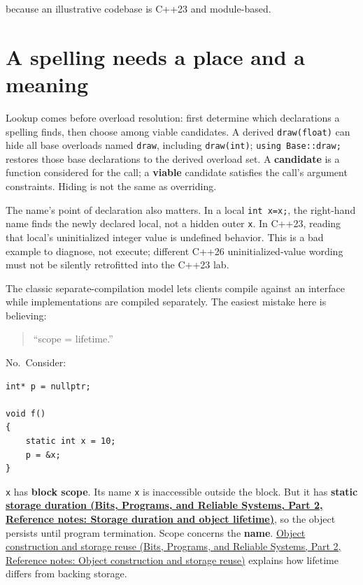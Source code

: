because an illustrative codebase is C++23 and module-based.

\section{A spelling needs a place and a meaning}\label{05-engine-i-ch002-a-spelling-needs-a-place-and-a-meaning}

\hypertarget{05-engine-i-ch002-a-spelling-needs-a-place-and-a-meaning}{}

Lookup comes before overload resolution: first determine which declarations a spelling finds, then choose among viable candidates. A derived \texttt{draw(float)} can hide all base overloads named \texttt{draw}, including \texttt{draw(int)}; \texttt{using\ Base::draw;} restores those base declarations to the derived overload set. A \textbf{candidate} is a function considered for the call; a \textbf{viable} candidate satisfies the call's argument constraints. Hiding is not the same as overriding.

The name's point of declaration also matters. In a local \texttt{int\ x=x;}, the right-hand name finds the newly declared local, not a hidden outer \texttt{x}. In C++23, reading that local's uninitialized integer value is undefined behavior. This is a bad example to diagnose, not execute; different C++26 uninitialized-value wording must not be silently retrofitted into the C++23 lab.

The classic separate-compilation model lets clients compile against an interface while implementations are compiled separately. The easiest mistake here is believing:

\begin{quote}
``scope = lifetime.''
\end{quote}

No.~Consider:

\begin{verbatim}
int* p = nullptr;

void f()
{
    static int x = 10;
    p = &x;
}
\end{verbatim}

\texttt{x} has \textbf{block scope}. Its name \texttt{x} is inaccessible outside the block. But it has \textbf{static \href{../01-Bits-Programs-and-Reliable-Systems-P02/main.pdf\#nameddest=appendix-0b104bcba06b}{storage duration (Bits, Programs, and Reliable Systems, Part 2, Reference notes: Storage duration and object lifetime)}}, so the object persists until program termination. Scope concerns the \textbf{name}. \href{../01-Bits-Programs-and-Reliable-Systems-P02/main.pdf\#nameddest=appendix-a82f9c438857}{Object construction and storage reuse (Bits, Programs, and Reliable Systems, Part 2, Reference notes: Object construction and storage reuse)} explains how lifetime differs from backing storage.

